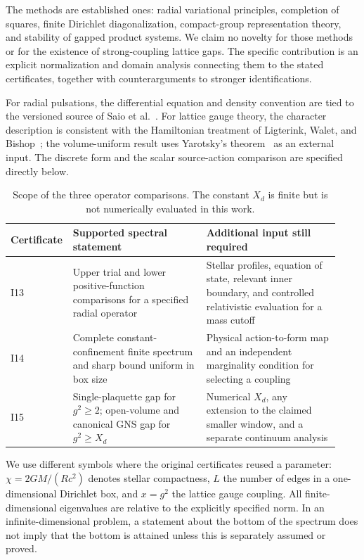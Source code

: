 \documentclass[11pt,letterpaper]{article}
\theoremstyle{definition}
\numberwithin{equation}{section}
\begin{document}
The methods are established ones: radial variational principles,
completion of squares, finite Dirichlet diagonalization, compact-group
representation theory, and stability of gapped product systems. We claim
no novelty for those methods or for the existence of strong-coupling lattice
gaps. The specific contribution is an explicit normalization and domain
analysis connecting them to the stated certificates, together with
counterarguments to stronger identifications.

For radial pulsations, the differential equation and density convention
are tied to the versioned source of Saio et al.~\cite{saio}. For lattice
gauge theory, the character description is consistent with the
Hamiltonian treatment of Ligterink, Walet, and Bishop~\cite{ligterink};
the volume-uniform result uses Yarotsky's theorem~\cite{yarotsky} as an
external input. The discrete form and the scalar source-action comparison
are specified directly below.

\begin{table}[htbp]
\centering\small
\begin{tabular}{@{}p{0.13\linewidth}p{0.40\linewidth}p{0.40\linewidth}@{}}
\toprule
Certificate & Supported spectral statement & Additional input still required\\
\midrule
I13 & Upper trial and lower positive-function comparisons for a specified
radial operator & Stellar profiles, equation of state, relevant inner
boundary, and controlled relativistic evaluation for a mass cutoff\\[4pt]
I14 & Complete constant-confinement finite spectrum and sharp bound uniform
in box size & Physical action-to-form map and an independent marginality
condition for selecting a coupling\\[4pt]
I15 & Single-plaquette gap for $g^2\ge2$; open-volume and canonical GNS gap
for $g^2\ge X_d$ & Numerical $X_d$, any extension to the claimed smaller
window, and a separate continuum analysis\\
\bottomrule
\end{tabular}
\caption{Scope of the three operator comparisons. The constant $X_d$ is
finite but is not numerically evaluated in this work.}
\label{tab:scope}
\end{table}

We use different symbols where the original certificates reused a
parameter: $\chi=2GM/(Rc^2)$ denotes stellar compactness, $L$ the number of
edges in a one-dimensional Dirichlet box, and $x=g^2$ the lattice gauge
coupling. All finite-dimensional eigenvalues are relative to the explicitly
specified norm. In an infinite-dimensional problem, a statement about the
bottom of the spectrum does not imply that the bottom is attained unless
this is separately assumed or proved.
\end{document}
